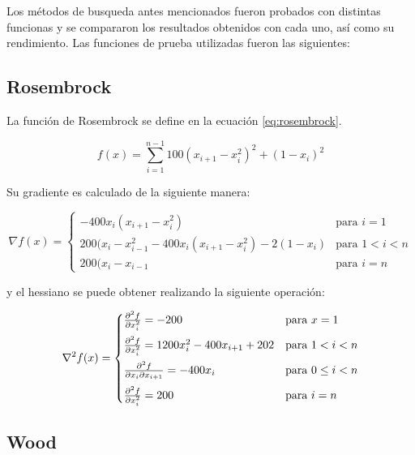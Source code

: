 Los métodos de busqueda antes mencionados fueron probados con distintas funcionas y se compararon los resultados obtenidos con cada uno, así como su rendimiento. Las funciones de prueba utilizadas fueron las siguientes:

\subsection*{Rosembrock}

La función de Rosembrock se define en la ecuación \ref{eq:rosembrock}.

\begin{equation}
    f(x) = \sum_{i=1}^{n-1}  100(x_{i+1}-x_{i}^2)^2 +(1-x_i)^2
    \label{eq:rosembrock}
\end{equation}

Su gradiente es calculado de la siguiente manera:

\begin{equation}
    \nabla f (x) =\begin{cases}
        -400x_i(x_{i+1}-x_{i}^2)                              & \text{para } i=1   \\[0.25cm]
        200(x_{i}-x_{i-1}^2-400x_i(x_{i+1}-x_{i}^2) -2(1-x_i) & \text{para } 1<i<n \\[0.25cm]
        200(x_{i}-x_{i-1}                                     & \text{para } i=n
    \end{cases} \label{eq:rosembrock_gradient}
\end{equation}


y el hessiano se puede obtener realizando la siguiente operación:

\begin{equation}
    \nabla^2 f(x)  = \begin{cases}
        \frac{\partial^2 f}{\partial x_i^2} = -200                    & \text{para } x=1         \\[0.25cm]
        \frac{\partial^2 f}{\partial x_i^2} =1200x_i^2-400x_{i+1}+202 & \text{para } 1<i<n       \\[0.25cm]
        \frac{\partial^2 f}{\partial x_i \partial x_{i+1}}  = -400x_i       & \text{para } 0\leq i < n \\[0.25cm]
        \frac{\partial^2 f}{\partial x_i^2} = 200                     & \text{para } i=n
    \end{cases}
    \label{eq:rosembrock_hessian}
\end{equation}

\subsection*{Wood}

